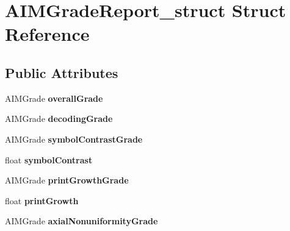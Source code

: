 \hypertarget{structAIMGradeReport__struct}{\section{\-A\-I\-M\-Grade\-Report\-\_\-struct \-Struct \-Reference}
\label{structAIMGradeReport__struct}
}
\subsection*{\-Public \-Attributes}
\begin{DoxyCompactItemize}
\item 
\hypertarget{structAIMGradeReport__struct_abdea17aeceb213fcd21796799125467d}{\-A\-I\-M\-Grade {\bfseries overall\-Grade}}\label{structAIMGradeReport__struct_abdea17aeceb213fcd21796799125467d}

\item 
\hypertarget{structAIMGradeReport__struct_a790f479f2593738df0688f1a9a73914f}{\-A\-I\-M\-Grade {\bfseries decoding\-Grade}}\label{structAIMGradeReport__struct_a790f479f2593738df0688f1a9a73914f}

\item 
\hypertarget{structAIMGradeReport__struct_a30a92fb152f130307721968315bd4b67}{\-A\-I\-M\-Grade {\bfseries symbol\-Contrast\-Grade}}\label{structAIMGradeReport__struct_a30a92fb152f130307721968315bd4b67}

\item 
\hypertarget{structAIMGradeReport__struct_adec59fed133a0a7d7c6144f5f8181c24}{float {\bfseries symbol\-Contrast}}\label{structAIMGradeReport__struct_adec59fed133a0a7d7c6144f5f8181c24}

\item 
\hypertarget{structAIMGradeReport__struct_aa34d3dffaad22d0d777d5732287c4b06}{\-A\-I\-M\-Grade {\bfseries print\-Growth\-Grade}}\label{structAIMGradeReport__struct_aa34d3dffaad22d0d777d5732287c4b06}

\item 
\hypertarget{structAIMGradeReport__struct_ad1338838e04aa6abba0f67fcc9fafb36}{float {\bfseries print\-Growth}}\label{structAIMGradeReport__struct_ad1338838e04aa6abba0f67fcc9fafb36}

\item 
\hypertarget{structAIMGradeReport__struct_a321f2af2c5531a99ebf49943bc582802}{\-A\-I\-M\-Grade {\bfseries axial\-Nonuniformity\-Grade}}\label{structAIMGradeReport__struct_a321f2af2c5531a99ebf49943bc582802}


\end{DoxyCompactItemize}
